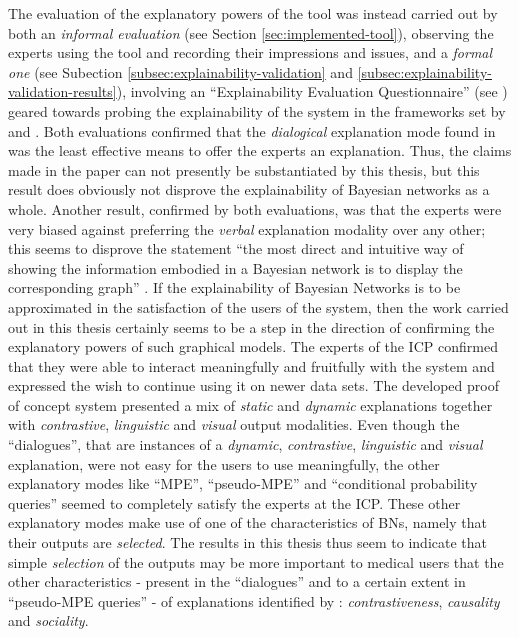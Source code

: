 The evaluation of the explanatory powers of the tool was instead carried out by both an \textit{informal evaluation} (see Section \ref{sec:implemented-tool}), observing the experts using the tool and recording their impressions and issues, and a \textit{formal one} (see Subection \ref{subsec:explainability-validation} and \ref{subsec:explainability-validation-results}), involving an \enquote{Explainability Evaluation Questionnaire} (see ) geared towards probing the explainability of the system in the frameworks set by \citet{lacave2002review} and \citet{miller2018explanation}.
Both evaluations confirmed that the \textit{dialogical} explanation mode found in \citet{Butz2018} was the least effective means to offer the experts an explanation.
Thus, the claims made in the paper can not presently be substantiated by this thesis, but this result does obviously not disprove the explainability of Bayesian networks as a whole.
Another result, confirmed by both evaluations, was that the experts were very biased against preferring the \textit{verbal} explanation modality over any other; this seems to disprove the statement \enquote{the most direct and intuitive way of showing the information embodied in a Bayesian network is to display the corresponding graph} \citep{lacave2002review}.
If the explainability of Bayesian Networks is to be approximated in the satisfaction of the users of the system, then the work carried out in this thesis certainly seems to be a step in the direction of confirming the explanatory powers of such graphical models.
The experts of the ICP confirmed that they were able to interact meaningfully and fruitfully with the system and expressed the wish to continue using it on newer data sets.
The developed proof of concept system presented a mix of \textit{static} and \textit{dynamic} explanations together with \textit{contrastive}, \textit{linguistic} and \textit{visual} output modalities.
Even though the \enquote{dialogues}, that are instances of a \textit{dynamic}, \textit{contrastive}, \textit{linguistic} and \textit{visual} explanation, were not easy for the users to use meaningfully, the other explanatory modes like \enquote{MPE}, \enquote{pseudo-MPE} and \enquote{conditional probability queries} seemed to completely satisfy the experts at the ICP.
These other explanatory modes make use of one of the characteristics of BNs, namely that their outputs are \textit{selected}.
The results in this thesis thus seem to indicate that simple \textit{selection} of the outputs may be more important to medical users that the other characteristics - present in the \enquote{dialogues} and to a certain extent in \enquote{pseudo-MPE queries} - of explanations identified by \citet{miller2018explanation}: \textit{contrastiveness}, \textit{causality} and \textit{sociality}.

